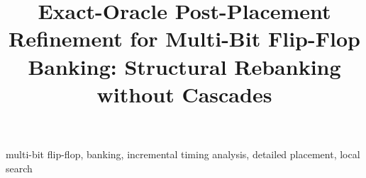 \documentclass[conference]{IEEEtran}
\begin{document}
\title{Exact-Oracle Post-Placement Refinement for Multi-Bit Flip-Flop Banking: Structural Rebanking without Cascades}
\author{}
\maketitle
\begin{abstract}

\end{abstract}
\begin{IEEEkeywords}
multi-bit flip-flop, banking, incremental timing analysis, detailed placement, local search
\end{IEEEkeywords}








\end{document}
